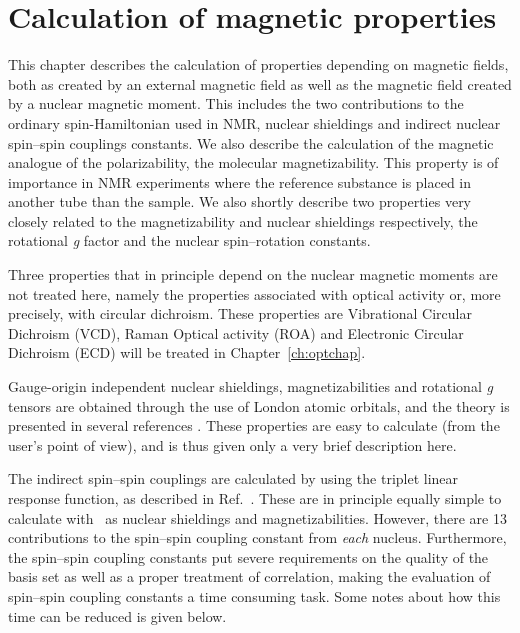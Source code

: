 \chapter{Calculation of magnetic properties}\label{ch:magnetic}

This chapter describes the calculation of properties depending on
magnetic fields, both as created by an external magnetic field as well
as the magnetic field created by a nuclear magnetic moment. 
This includes the two 
contributions to the ordinary spin-Hamiltonian used in NMR, nuclear
shieldings and indirect nuclear spin--spin
couplings constants. We
also describe the calculation of the magnetic analogue of the
polarizability, the molecular
magnetizability. This property  
is of importance in NMR experiments where the reference substance is placed
in another tube than the sample. We also shortly
describe two properties very closely related to the magnetizability
and nuclear shieldings respectively, the rotational {\em g} factor and the
nuclear spin--rotation constants.

Three properties that in principle depend on the nuclear magnetic
moments are not treated here, namely the properties associated with
optical activity or, more precisely, with circular dichroism. These
properties are Vibrational Circular Dichroism
(VCD), Raman Optical
activity (ROA) and Electronic Circular
Dichroism (ECD) will be
treated in Chapter~\ref{ch:optchap}.

Gauge-origin independent nuclear shieldings,
magnetizabilities 
and rotational {\em g} tensors are
obtained through the use of London atomic orbitals, and the theory is
presented in several references
\cite{kwjfhppjacs112,krthrkpjklbhjajjcp100,krthklbpjhjajjcp99,krthklbpjjocp195}.
These properties are easy to calculate (from the user's point of
view), and is thus given only a very brief description here.

The indirect spin--spin couplings are calculated by using the triplet linear
response function, as described in
Ref.~\cite{ovhapjhjajsbpthjcp96}. 
These are in principle equally simple to calculate with \siraba\ as
nuclear shieldings and magnetizabilities. However, there are 13
contributions to the spin--spin coupling constant from {\em each}
nucleus. Furthermore, the spin--spin coupling constants put severe
requirements on the quality of the basis set as well as a proper
treatment of correlation, making the evaluation of spin--spin coupling
constants a time consuming task. Some notes about how this time
can be reduced is given below.

